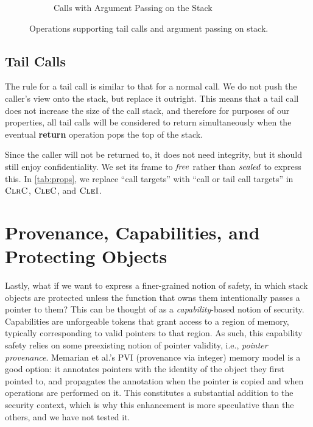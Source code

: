 \documentclass[10pt,conference]{ieeetran}%
\theoremstyle{definition}
\begin{document}
\begin{figure*}
\begin{subfigure}{0.6\textwidth}
    \caption{Calls with Argument Passing on the Stack}
    \label{sfig:stkargs}
  \end{subfigure}
  \caption{Operations supporting tail calls and argument passing on stack.}
  \label{fig:advops}
\end{figure*}

\subsection{Tail Calls}

The rule for a tail call is similar to that for a normal call.
We do not push the caller's view onto the stack,
but replace it outright. This means that a tail call does not increase the size of
the call stack, and therefore for purposes of our properties, all tail
calls will
be considered to return simultaneously when the eventual {\bf return} operation
pops the top of the stack.

Since the caller will not be returned to, it does not need integrity, but
it should still enjoy confidentiality. We set its frame to \(\mathit{free}\) rather
than \(\mathit{sealed}\) to express this. In \cref{tab:props}, we replace
``call targets'' with ``call or tail call targets'' in \(\textnormal{\sc ClrC}\), \(\textnormal{\sc CleC}\), and \(\textnormal{\sc CleI}\).

\section{Provenance, Capabilities, and Protecting Objects}
\label{app:ptr}

Lastly, what if we want to express a finer-grained notion of safety, in which
stack objects are protected unless the function that owns them intentionally
passes a pointer to them? This can be thought of as a {\it capability}-based
notion of security. Capabilities are unforgeable tokens that grant access to
a region of memory, typically corresponding to valid pointers to that region.
As such, this capability safety relies on some preexisting notion of pointer
validity, i.e., {\it pointer provenance}.
Memarian et al.'s PVI \cite{provenance} (provenance via integer)
memory model is a good option: it annotates pointers with the identity of the
object they first pointed to, and propagates the annotation when the
pointer is copied and when operations are performed on it.
This constitutes a substantial addition to the security context, which is why
this enhancement is more speculative than the others, and we have not tested it.
\end{document}
